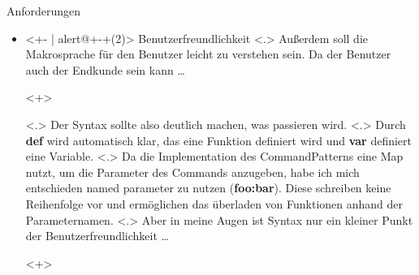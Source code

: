 \begin{frame}{Anforderungen}
\begin{itemize}
{              Ein Beispiel wäre \ldots
            }
        \begin{uncoverenv}<+-+>
          \tabto{4.6cm}
          \myMIn$if(has_unsaved()) \{ save(); \}$\hspace*{-4cm} %
        \end{uncoverenv}
            \note[item]<.>{
              Das ein Makro nur probiert zu speichern, wenn es etwas zum speichern gibt.
            }
            \note[item]<.>{
              Generell sollte speichern schnell gehen, allerdings kann es passieren, dass eine mehrere Gigabyte große Datei geschrieben werden muss, was dem Nutzer nicht zumuten ist.
            }
      \item<+- | alert@+-+(2)>
        Benutzerfreundlichkeit
            \note[item]<.>{
              Außerdem soll die Makrosprache für den Benutzer leicht zu verstehen sein. Da der Benutzer auch der Endkunde sein kann \ldots
            }
        \begin{uncoverenv}<+>
        \end{uncoverenv}
            \note[item]<.>{
              Der Syntax sollte also deutlich machen, was passieren wird.
            }
            \note[item]<.>{
              Durch \textbf{def} wird automatisch klar, das eine Funktion definiert wird und \textbf{var} definiert eine Variable.
            }
            \note[item]<.>{
              Da die Implementation des CommandPatterns eine Map nutzt, um die Parameter des Commands anzugeben, habe ich mich entschieden named parameter zu nutzen (\textbf{foo:bar}). Diese schreiben keine Reihenfolge vor und ermöglichen das überladen von Funktionen anhand der Parameternamen.
            }
            \note[item]<.>{
              Aber in meine Augen ist Syntax nur ein kleiner Punkt der Benutzerfreundlichkeit \ldots
            }
        \begin{uncoverenv}<+>
\end{uncoverenv}
\end{itemize}
\end{frame}
